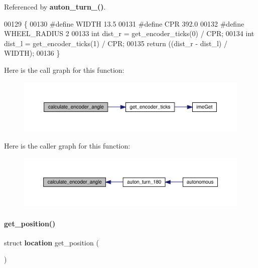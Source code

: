 Referenced by \textbf{ auton\+\_\+turn\+\_()}.


\begin{DoxyCode}
00129                               \{
00130 \textcolor{preprocessor}{#define WIDTH 13.5}
00131 \textcolor{preprocessor}{#define CPR 392.0}
00132 \textcolor{preprocessor}{#define WHEEL\_RADIUS 2}
00133   \textcolor{keywordtype}{int} dist\_r = get_encoder_ticks(0) / CPR;
00134   \textcolor{keywordtype}{int} dist\_l = get_encoder_ticks(1) / CPR;
00135   \textcolor{keywordflow}{return} ((dist\_r - dist\_l) / WIDTH);
00136 \}
\end{DoxyCode}
Here is the call graph for this function\+:
\nopagebreak
\begin{figure}[H]
\begin{center}
\leavevmode
\includegraphics[width=350pt]{localization_8h_a5dd17937f5561711cd12cdefa8d31869_cgraph}
\end{center}
\end{figure}
Here is the caller graph for this function\+:
\nopagebreak
\begin{figure}[H]
\begin{center}
\leavevmode
\includegraphics[width=350pt]{localization_8h_a5dd17937f5561711cd12cdefa8d31869_icgraph}
\end{center}
\end{figure}
\mbox{\label{localization_8h_aadbff35bb757f60bc348d4d778f57a2f}} 
\paragraph{get\+\_\+position()}
{\footnotesize\ttfamily struct \textbf{ location} get\+\_\+position (\begin{DoxyParamCaption}{ }\end{DoxyParamCaption})}



